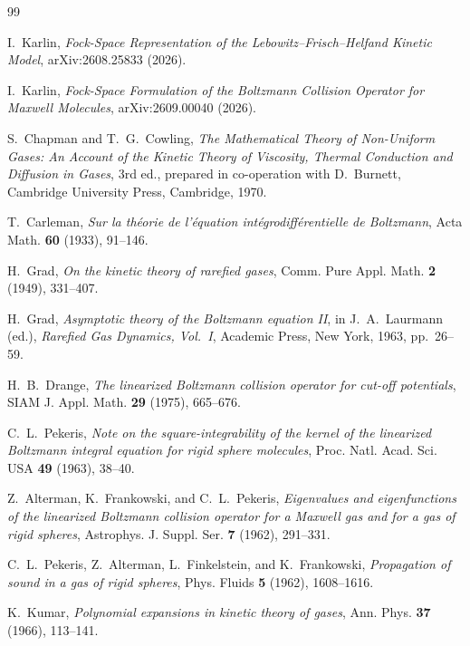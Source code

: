 \documentclass[11pt]{article}
\numberwithin{equation}{section}
\theoremstyle{definition}
\begin{document}
\begin{thebibliography}{99}

I.~Karlin,
\emph{Fock-Space Representation of the Lebowitz--Frisch--Helfand Kinetic Model},
arXiv:2608.25833 (2026).

I.~Karlin,
\emph{Fock-Space Formulation of the Boltzmann Collision Operator for Maxwell Molecules},
arXiv:2609.00040 (2026).

S.~Chapman and T.~G.~Cowling,
\emph{The Mathematical Theory of Non-Uniform Gases: An Account of the Kinetic
Theory of Viscosity, Thermal Conduction and Diffusion in Gases},
3rd ed., prepared in co-operation with D.~Burnett,
Cambridge University Press, Cambridge, 1970.

T.~Carleman,
\emph{Sur la th\'eorie de l'\'equation int\'egrodiff\'erentielle de Boltzmann},
Acta Math. \textbf{60} (1933), 91--146.

H.~Grad,
\emph{On the kinetic theory of rarefied gases},
Comm. Pure Appl. Math. \textbf{2} (1949), 331--407.

H.~Grad,
\emph{Asymptotic theory of the Boltzmann equation II},
in J.~A.~Laurmann (ed.),
\emph{Rarefied Gas Dynamics, Vol.~I},
Academic Press, New York, 1963, pp.~26--59.

H.~B.~Drange,
\emph{The linearized Boltzmann collision operator for cut-off potentials},
SIAM J. Appl. Math. \textbf{29} (1975), 665--676.

C.~L.~Pekeris,
\emph{Note on the square-integrability of the kernel of the linearized
Boltzmann integral equation for rigid sphere molecules},
Proc. Natl. Acad. Sci. USA \textbf{49} (1963), 38--40.

Z.~Alterman, K.~Frankowski, and C.~L.~Pekeris,
\emph{Eigenvalues and eigenfunctions of the linearized Boltzmann collision
operator for a Maxwell gas and for a gas of rigid spheres},
Astrophys. J. Suppl. Ser. \textbf{7} (1962), 291--331.

C.~L.~Pekeris, Z.~Alterman, L.~Finkelstein, and K.~Frankowski,
\emph{Propagation of sound in a gas of rigid spheres},
Phys. Fluids \textbf{5} (1962), 1608--1616.

K.~Kumar,
\emph{Polynomial expansions in kinetic theory of gases},
Ann. Phys. \textbf{37} (1966), 113--141.


\end{thebibliography}
\end{document}
